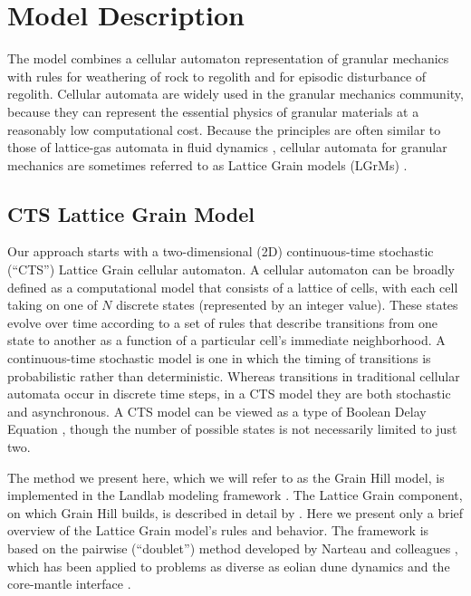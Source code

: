 \documentclass[esurf, manuscript]{copernicus}
\begin{document}
\section{Model Description}

The model combines a cellular automaton representation of granular mechanics with rules for weathering of rock to regolith and for episodic disturbance of regolith. Cellular automata are widely used in the granular mechanics community, because they can represent the essential physics of granular materials at a reasonably low computational cost. Because the principles are often similar to those of lattice-gas automata in fluid dynamics \citep[e.g.,][]{chen1998lattice}, cellular automata for granular mechanics are sometimes referred to as Lattice Grain models (LGrMs)  \citep{gutt1990automata,peng1994density,alonso1996shape,karolyi1998filling,karolyi1999granular,karolyi1998lattice,martinez1998lattice,deserable2002versatile,cottenceau2010open,deserable2011cellular}.

\subsection{CTS Lattice Grain Model}

Our approach starts with a two-dimensional (2D) continuous-time stochastic (``CTS'') Lattice Grain cellular automaton. A cellular automaton can be broadly defined as a computational model that consists of a lattice of cells, with each cell taking on one of $N$ discrete states (represented by an integer value). These states evolve over time according to a set of rules that describe transitions from one state to another as a function of a particular cell's immediate neighborhood. A continuous-time stochastic model  is one in which the timing of transitions is probabilistic rather than deterministic. Whereas transitions in traditional cellular automata occur in discrete time steps, in a CTS model they are both stochastic and asynchronous. A CTS model can be viewed as a type of Boolean Delay Equation \citep{ghil2008boolean}, though the number of possible states is not necessarily limited to just two.

The method we present here, which we will refer to as the Grain Hill model, is implemented in the Landlab modeling framework \citep{hobley2017creative}. The Lattice Grain component, on which Grain Hill builds, is described in detail by \citet{tucker2016celllab}. Here we present only a brief overview of the Lattice Grain model's rules and behavior. The framework is based on the pairwise (``doublet'') method developed by Narteau and colleagues \citep{rozier2014real}, which has been applied to problems as diverse as eolian dune dynamics \citep{narteau2009setting,zhang2010morphodynamics,zhang2012morphology} and the core-mantle interface \citep{narteau2001small}.
\end{document}
